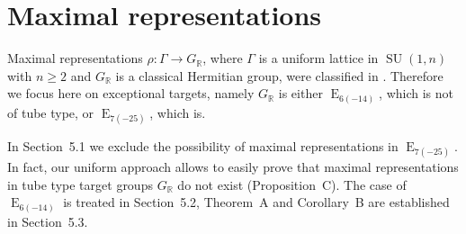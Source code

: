 \section{Maximal representations}
Maximal representations $\rho:\Gamma\to G_{\mathbb R}$, where $\Gamma$ is a uniform lattice in $\operatorname{SU}(1,n)$ with $n\geqslant2$ and $G_{\mathbb R}$ is a classical Hermitian group, were classified in \cite{jep93KM17}. Therefore we focus here on exceptional targets, namely $G_{\mathbb R}$ is either $\operatorname E_{6(-14)}$, which is not of tube type, or $\operatorname E_{7(-25)}$, which is.

In Section~5.1 we exclude the possibility of maximal representations in $\operatorname E_{7(-25)}$. In fact, our uniform approach allows to easily prove that maximal representations in tube type target groups $G_{\mathbb R}$ do not exist (Proposition~C). The case of $\operatorname E_{6(-14)}$ is treated in Section~5.2, Theorem~A and Corollary~B are established in Section~5.3.

